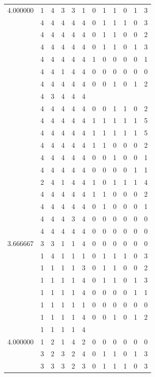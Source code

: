 \documentclass[]{book}
\theoremstyle{definition}
\theoremstyle{definition}
\theoremstyle{definition}
\theoremstyle{remark}
\begin{document}
\begin{table}
{\begin{tabular}[t]{rrrrrrrrrrrr}
4.000000 & 1 & 4 & 3 & 3 & 1 & 0 & 1 & 1 & 0 & 1 & 3\\
 & 4 & 4 & 4 & 4 & 4 & 0 & 1 & 1 & 1 & 0 & 3\\
 & 4 & 4 & 4 & 4 & 4 & 0 & 1 & 1 & 0 & 0 & 2\\
 & 4 & 4 & 4 & 4 & 4 & 0 & 1 & 1 & 0 & 1 & 3\\
 & 4 & 4 & 4 & 4 & 4 & 1 & 0 & 0 & 0 & 0 & 1\\
 & 4 & 4 & 1 & 4 & 4 & 0 & 0 & 0 & 0 & 0 & 0\\
 & 4 & 4 & 4 & 4 & 4 & 0 & 0 & 1 & 0 & 1 & 2\\
 & 4 & 3 & 4 & 4 & 4 &  &  &  &  &  & \\
 & 4 & 4 & 4 & 4 & 4 & 0 & 0 & 1 & 1 & 0 & 2\\
 & 4 & 4 & 4 & 4 & 4 & 1 & 1 & 1 & 1 & 1 & 5\\
 & 4 & 4 & 4 & 4 & 4 & 1 & 1 & 1 & 1 & 1 & 5\\
 & 4 & 4 & 4 & 4 & 4 & 1 & 1 & 0 & 0 & 0 & 2\\
 & 4 & 4 & 4 & 4 & 4 & 0 & 0 & 1 & 0 & 0 & 1\\
 & 4 & 4 & 4 & 4 & 4 & 0 & 0 & 0 & 0 & 1 & 1\\
 & 2 & 4 & 1 & 4 & 4 & 1 & 0 & 1 & 1 & 1 & 4\\
 & 4 & 4 & 4 & 4 & 4 & 1 & 1 & 0 & 0 & 0 & 2\\
 & 4 & 4 & 4 & 4 & 4 & 0 & 1 & 0 & 0 & 0 & 1\\
 & 4 & 4 & 4 & 3 & 4 & 0 & 0 & 0 & 0 & 0 & 0\\
 & 4 & 4 & 4 & 4 & 4 & 0 & 0 & 0 & 0 & 0 & 0\\
3.666667 & 3 & 3 & 1 & 1 & 4 & 0 & 0 & 0 & 0 & 0 & 0\\
 & 1 & 4 & 1 & 1 & 1 & 0 & 1 & 1 & 1 & 0 & 3\\
 & 1 & 1 & 1 & 1 & 3 & 0 & 1 & 1 & 0 & 0 & 2\\
 & 1 & 1 & 1 & 1 & 4 & 0 & 1 & 1 & 0 & 1 & 3\\
 & 1 & 1 & 1 & 1 & 4 & 0 & 0 & 0 & 0 & 1 & 1\\
 & 1 & 1 & 1 & 1 & 1 & 0 & 0 & 0 & 0 & 0 & 0\\
 & 1 & 1 & 1 & 1 & 4 & 0 & 0 & 1 & 0 & 1 & 2\\
 & 1 & 1 & 1 & 1 & 4 &  &  &  &  &  & \\
4.000000 & 1 & 2 & 1 & 4 & 2 & 0 & 0 & 0 & 0 & 0 & 0\\
 & 3 & 2 & 3 & 2 & 4 & 0 & 1 & 1 & 0 & 1 & 3\\
 & 3 & 3 & 3 & 2 & 3 & 0 & 1 & 1 & 1 & 0 & 3\\

\end{tabular}}
\end{table}
\end{document}
